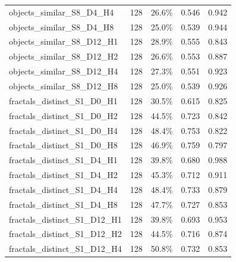 \documentclass[11pt]{article}
\begin{document}
\begin{longtable}{p{}rrrr}
objects\_\allowbreak{}similar\_\allowbreak{}S8\_\allowbreak{}D4\_\allowbreak{}H4 & 128 & 26.6\% & 0.546 & 0.942\\
objects\_\allowbreak{}similar\_\allowbreak{}S8\_\allowbreak{}D4\_\allowbreak{}H8 & 128 & 25.0\% & 0.539 & 0.944\\
objects\_\allowbreak{}similar\_\allowbreak{}S8\_\allowbreak{}D12\_\allowbreak{}H1 & 128 & 28.9\% & 0.555 & 0.843\\
objects\_\allowbreak{}similar\_\allowbreak{}S8\_\allowbreak{}D12\_\allowbreak{}H2 & 128 & 26.6\% & 0.553 & 0.887\\
objects\_\allowbreak{}similar\_\allowbreak{}S8\_\allowbreak{}D12\_\allowbreak{}H4 & 128 & 27.3\% & 0.551 & 0.923\\
objects\_\allowbreak{}similar\_\allowbreak{}S8\_\allowbreak{}D12\_\allowbreak{}H8 & 128 & 25.0\% & 0.539 & 0.926\\
fractals\_\allowbreak{}distinct\_\allowbreak{}S1\_\allowbreak{}D0\_\allowbreak{}H1 & 128 & 30.5\% & 0.615 & 0.825\\
fractals\_\allowbreak{}distinct\_\allowbreak{}S1\_\allowbreak{}D0\_\allowbreak{}H2 & 128 & 44.5\% & 0.723 & 0.842\\
fractals\_\allowbreak{}distinct\_\allowbreak{}S1\_\allowbreak{}D0\_\allowbreak{}H4 & 128 & 48.4\% & 0.753 & 0.822\\
fractals\_\allowbreak{}distinct\_\allowbreak{}S1\_\allowbreak{}D0\_\allowbreak{}H8 & 128 & 46.9\% & 0.759 & 0.797\\
fractals\_\allowbreak{}distinct\_\allowbreak{}S1\_\allowbreak{}D4\_\allowbreak{}H1 & 128 & 39.8\% & 0.680 & 0.988\\
fractals\_\allowbreak{}distinct\_\allowbreak{}S1\_\allowbreak{}D4\_\allowbreak{}H2 & 128 & 45.3\% & 0.712 & 0.911\\
fractals\_\allowbreak{}distinct\_\allowbreak{}S1\_\allowbreak{}D4\_\allowbreak{}H4 & 128 & 48.4\% & 0.733 & 0.879\\
fractals\_\allowbreak{}distinct\_\allowbreak{}S1\_\allowbreak{}D4\_\allowbreak{}H8 & 128 & 47.7\% & 0.727 & 0.853\\
fractals\_\allowbreak{}distinct\_\allowbreak{}S1\_\allowbreak{}D12\_\allowbreak{}H1 & 128 & 39.8\% & 0.693 & 0.953\\
fractals\_\allowbreak{}distinct\_\allowbreak{}S1\_\allowbreak{}D12\_\allowbreak{}H2 & 128 & 44.5\% & 0.716 & 0.874\\
fractals\_\allowbreak{}distinct\_\allowbreak{}S1\_\allowbreak{}D12\_\allowbreak{}H4 & 128 & 50.8\% & 0.732 & 0.853\\

\end{longtable}
\end{document}
